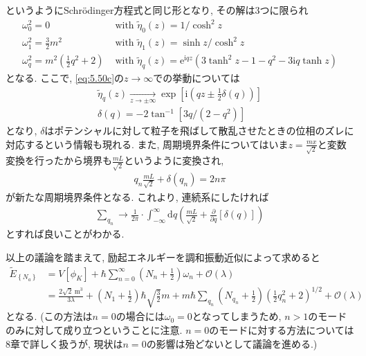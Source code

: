 \documentclass[dvipdfmx,11pt,a4paper,oneside,openany]{jsbook}
\begin{document}
というようにSchr\"{o}dinger方程式と同じ形となり, その解は3つに限られ
\begin{subequations}
    \begin{align}
        \omega_{0}^{2}=0                                     & \text { with } \tilde{\eta}_{0}(z)=1 / \cosh ^{2} z                                                                                     \\
        \omega_{1}^{2}=\frac{3}{2} m^{2}                     & \text { with } \tilde{\eta}_{1}(z)=\sinh z / \cosh ^{2} z                                                                               \\
        \omega_{q}^{2}=m^{2}\left(\frac{1}{2} q^{2}+2\right) & \text{ with } \tilde{\eta}_{q}(z)=\mathrm{e}^{\mathrm{i} q z}\left(3 \tanh ^{2} z-1-q^{2}-3 \mathrm{i} q \tanh z\right)\label{eq:5.50c}
    \end{align}
\end{subequations}
となる. ここで, \eqref{eq:5.50c}の$z\rightarrow\infty$での挙動については
\begin{align}
    \tilde{\eta}_{q}(z) \underset{z \rightarrow \pm \infty}{\longrightarrow} \exp \left[\mathrm{i}\left(q z \pm \frac{1}{2} \delta(q)\right)\right]\label{eq:5.51} \\
    \delta(q)=-2 \tan ^{-1}\left[3 q /\left(2-q^{2}\right)\right]
\end{align}
となり, $\delta$はポテンシャルに対して粒子を飛ばして散乱させたときの位相のズレに対応するという情報も現れる. また, 周期境界条件についてはいま$z=\frac{mx}{\sqrt{2}}$と変数変換を行ったから境界も$\frac{mL}{\sqrt{2}}$というように変換され,
\begin{align}
    q_{n}\frac{mL}{\sqrt{2}}+\delta\left(q_{n}\right)=2 n \pi
\end{align}
が新たな周期境界条件となる. これより, 連続系にしたければ
\begin{align}
    \sum_{q_{n}} \rightarrow \frac{1}{2 \pi} \cdot \int_{-\infty}^{\infty} \mathrm{d} q\left(\frac{m L}{\sqrt{2}}+\frac{\partial}{\partial q}[\delta(q)]\right)
\end{align}
とすれば良いことがわかる.

以上の議論を踏まえて, 励起エネルギーを調和振動近似によって求めると
\begin{align}
    \tilde{E}_{\left\{N_{a}\right\}} & =V\left[\phi_{K}\right]+\hbar \sum_{n=0}^{\infty}\left(N_{n}+\frac{1}{2}\right) \omega_{n}+\mathcal{O}(\lambda)\label{eq:5.55}                                                                                                                 \\
                                     & =\frac{2 \sqrt{2} \mathrm{~m}^{3}}{3 \lambda}+\left(N_{1}+\frac{1}{2}\right) \hbar \sqrt{\frac{3}{2}} m+m \hbar \sum_{q_{n}}\left(N_{q_{n}}+\frac{1}{2}\right)\left(\frac{1}{2} q_{n}^{2}+2\right)^{1 / 2}+\mathcal{O}(\lambda)\label{eq:5.56}
\end{align}
となる. (この方法は$n=0$の場合には$\omega_0=0$となってしまうため, $n>1$のモードのみに対して成り立つということに注意. $n=0$のモードに対する方法については8章で詳しく扱うが, 現状は$n=0$の影響は殆どないとして議論を進める.)
\end{document}
